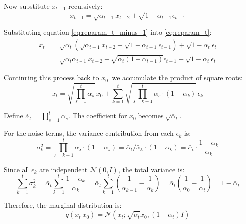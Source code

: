 \documentclass[a4paper,12pt]{article}
\begin{document}
Now substitute $x_{t-1}$ recursively:
\begin{equation}
x_{t-1} = \sqrt{\alpha_{t-1}} x_{t-2} + \sqrt{1 - \alpha_{t-1}} \epsilon_{t-1}
\label{eq:reparam_t_minus_1}
\end{equation}

Substituting equation \eqref{eq:reparam_t_minus_1} into \eqref{eq:reparam_t}:
\begin{align}
x_t &= \sqrt{\alpha_t} \left( \sqrt{\alpha_{t-1}} x_{t-2} + \sqrt{1 - \alpha_{t-1}} \epsilon_{t-1} \right) + \sqrt{1 - \alpha_t} \epsilon_t \\
&= \sqrt{\alpha_t \alpha_{t-1}} x_{t-2} + \sqrt{\alpha_t (1 - \alpha_{t-1})} \epsilon_{t-1} + \sqrt{1 - \alpha_t} \epsilon_t
\label{eq:expanded_xt}
\end{align}

Continuing this process back to $x_0$, we accumulate the product of square roots:
\begin{equation}
x_t = \sqrt{\prod_{s=1}^t \alpha_s} \, x_0 + \sum_{k=1}^t \sqrt{\prod_{s=k+1}^t \alpha_s \cdot (1 - \alpha_k)} \, \epsilon_k
\label{eq:recursive_form}
\end{equation}

Define $\bar{\alpha}_t = \prod_{s=1}^t \alpha_s$. The coefficient for $x_0$ becomes $\sqrt{\bar{\alpha}_t}$.

For the noise terms, the variance contribution from each $\epsilon_k$ is:
\begin{equation}
\sigma_k^2 = \prod_{s=k+1}^t \alpha_s \cdot (1 - \alpha_k) = \bar{\alpha}_t / \bar{\alpha}_k \cdot (1 - \alpha_k) = \bar{\alpha}_t \cdot \frac{1 - \alpha_k}{\bar{\alpha}_k}
\label{eq:variance_term}
\end{equation}

Since all $\epsilon_k$ are independent $\mathcal{N}(0, I)$, the total variance is:
\begin{equation}
\sum_{k=1}^t \sigma_k^2 = \bar{\alpha}_t \sum_{k=1}^t \frac{1 - \alpha_k}{\bar{\alpha}_k} = \bar{\alpha}_t \sum_{k=1}^t \left( \frac{1}{\bar{\alpha}_{k-1}} - \frac{1}{\bar{\alpha}_k} \right) = \bar{\alpha}_t \left( \frac{1}{\bar{\alpha}_0} - \frac{1}{\bar{\alpha}_t} \right) = 1 - \bar{\alpha}_t
\label{eq:total_variance}
\end{equation}

Therefore, the marginal distribution is:
\begin{equation}
q(x_t | x_0) = \mathcal{N}\left(x_t; \sqrt{\bar{\alpha}_t} x_0, (1 - \bar{\alpha}_t) I\right)
\label{eq:marginal_closed_form}
\end{equation}
\end{document}
